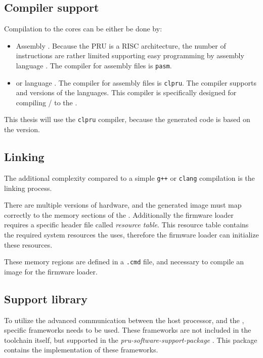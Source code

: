 \subsection{Compiler support}

Compilation to the \pru{} cores can be either be done by:
\begin{itemize}
	\item Assembly \citep{PRU_ASM}. Because the PRU is a RISC architecture, the number of instructions are rather limited supporting easy programming by assembly language \citep{PRU_ASM_INSTR}. The compiler for assembly files is \verb+pasm+.
	\item \cpl{} or \cpp{} language \citep{PRU_C_CPP}. The compiler for assembly files is \verb+clpru+. The compiler supports  and  versions of the languages. This compiler is specifically designed for compiling \cpl{}/\cpp{} to the \pru.
\end{itemize}
This thesis will use the \verb+clpru+ compiler, because the generated code is based on the  version.

\subsection{Linking}
\label{subs:linking}

The additional complexity compared to a simple \verb/g++/ or \verb/clang/ compilation is the linking process.

There are multiple versions of \pru{} hardware, and the generated image must map correctly to the memory sections of the \pru. Additionally the firmware loader requires a specific header file called \emph{resource table}. This resource table contains the required system resources the \pru{} uses, therefore the firmware loader can initialize these resources.

These memory regions are defined in a \verb+.cmd+ file, and necessary to compile an \elf{} image for the firmware loader.

\subsection{Support library}

To utilize the advanced communication between the host processor, and the \pru, specific frameworks needs to be used. These frameworks are not included in the \pru{} \cpp{} toolchain itself, but supported in the \emph{pru-software-support-package} \citep{TI_PRUSS_REPO}. This package contains the implementation of these  frameworks.

